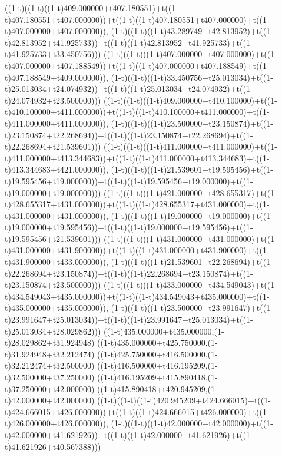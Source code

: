 ((1-t)((1-t)((1-t)409.000000+t407.180551)+t((1-t)407.180551+t407.000000))+t((1-t)((1-t)407.180551+t407.000000)+t((1-t)407.000000+t407.000000)),                                     (1-t)((1-t)((1-t)43.289749+t42.813952)+t((1-t)42.813952+t41.925733))+t((1-t)((1-t)42.813952+t41.925733)+t((1-t)41.925733+t33.450756)))
((1-t)((1-t)((1-t)407.000000+t407.000000)+t((1-t)407.000000+t407.188549))+t((1-t)((1-t)407.000000+t407.188549)+t((1-t)407.188549+t409.000000)),                                     (1-t)((1-t)((1-t)33.450756+t25.013034)+t((1-t)25.013034+t24.074932))+t((1-t)((1-t)25.013034+t24.074932)+t((1-t)24.074932+t23.500000)))
((1-t)((1-t)((1-t)409.000000+t410.100000)+t((1-t)410.100000+t411.000000))+t((1-t)((1-t)410.100000+t411.000000)+t((1-t)411.000000+t411.000000)),                                     (1-t)((1-t)((1-t)23.500000+t23.150874)+t((1-t)23.150874+t22.268694))+t((1-t)((1-t)23.150874+t22.268694)+t((1-t)22.268694+t21.539601)))
((1-t)((1-t)((1-t)411.000000+t411.000000)+t((1-t)411.000000+t413.344683))+t((1-t)((1-t)411.000000+t413.344683)+t((1-t)413.344683+t421.000000)),                                     (1-t)((1-t)((1-t)21.539601+t19.595456)+t((1-t)19.595456+t19.000000))+t((1-t)((1-t)19.595456+t19.000000)+t((1-t)19.000000+t19.000000)))
((1-t)((1-t)((1-t)421.000000+t428.655317)+t((1-t)428.655317+t431.000000))+t((1-t)((1-t)428.655317+t431.000000)+t((1-t)431.000000+t431.000000)),                                     (1-t)((1-t)((1-t)19.000000+t19.000000)+t((1-t)19.000000+t19.595456))+t((1-t)((1-t)19.000000+t19.595456)+t((1-t)19.595456+t21.539601)))
((1-t)((1-t)((1-t)431.000000+t431.000000)+t((1-t)431.000000+t431.900000))+t((1-t)((1-t)431.000000+t431.900000)+t((1-t)431.900000+t433.000000)),                                     (1-t)((1-t)((1-t)21.539601+t22.268694)+t((1-t)22.268694+t23.150874))+t((1-t)((1-t)22.268694+t23.150874)+t((1-t)23.150874+t23.500000)))
((1-t)((1-t)((1-t)433.000000+t434.549043)+t((1-t)434.549043+t435.000000))+t((1-t)((1-t)434.549043+t435.000000)+t((1-t)435.000000+t435.000000)),                                     (1-t)((1-t)((1-t)23.500000+t23.991647)+t((1-t)23.991647+t25.013034))+t((1-t)((1-t)23.991647+t25.013034)+t((1-t)25.013034+t28.029862)))
((1-t)435.000000+t435.000000,(1-t)28.029862+t31.924948)
((1-t)435.000000+t425.750000,(1-t)31.924948+t32.212474)
((1-t)425.750000+t416.500000,(1-t)32.212474+t32.500000)
((1-t)416.500000+t416.195209,(1-t)32.500000+t37.250000)
((1-t)416.195209+t415.890418,(1-t)37.250000+t42.000000)
((1-t)415.890418+t420.945209,(1-t)42.000000+t42.000000)
((1-t)((1-t)((1-t)420.945209+t424.666015)+t((1-t)424.666015+t426.000000))+t((1-t)((1-t)424.666015+t426.000000)+t((1-t)426.000000+t426.000000)),                                     (1-t)((1-t)((1-t)42.000000+t42.000000)+t((1-t)42.000000+t41.621926))+t((1-t)((1-t)42.000000+t41.621926)+t((1-t)41.621926+t40.567388)))
